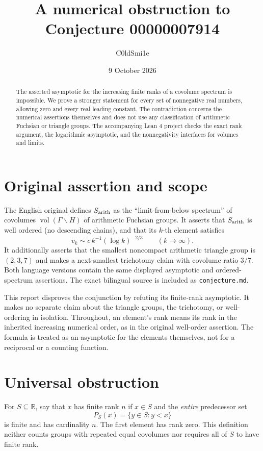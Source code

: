 \documentclass[11pt]{article}
\title{A numerical obstruction to Conjecture 00000007914}
\author{C0ldSmi1e}
\date{9 October 2026}
\newcommand{\R}{\mathbb R}
\begin{document}
\maketitle
\begin{abstract}
The asserted asymptotic for the increasing finite ranks of a covolume
spectrum is impossible. We prove a stronger statement for every set of
nonnegative real numbers, allowing zero and every real leading constant.
The contradiction concerns the numerical assertions themselves and does
not use any classification of arithmetic Fuchsian or triangle groups.
The accompanying Lean 4 project checks the exact rank argument, the
logarithmic asymptotic, and the nonnegativity interfaces for volumes and limits.
\end{abstract}

\section{Original assertion and scope}
The English original defines $S_{\rm arith}$ as the ``limit-from-below
spectrum'' of covolumes $\operatorname{vol}(\Gamma\backslash H)$ of
arithmetic Fuchsian groups. It asserts that $S_{\rm arith}$ is well ordered
(no descending chains), and that its $k$-th element satisfies
\begin{equation}\label{eq:source}
 v_k\sim c\,k^{-1}(\log k)^{-2/3}\qquad(k\longrightarrow\infty).
\end{equation}
It additionally asserts that the smallest noncompact arithmetic triangle
group is $(2,3,7)$ and makes a next-smallest trichotomy claim with covolume
ratio $3/7$. Both language versions contain the same displayed asymptotic
and ordered-spectrum assertions. The exact bilingual source is included
as \texttt{conjecture.md}.

This report disproves the conjunction by refuting its finite-rank
asymptotic. It makes no separate claim about the triangle groups,
the trichotomy, or well-ordering in isolation. Throughout, an element's
rank means its rank in the inherited increasing numerical order, as in
the original well-order assertion. The formula is treated as an
asymptotic for the elements themselves, not for a reciprocal or a
counting function.

\section{Universal obstruction}
For $S\subseteq\R$, say that $x$ has finite rank $n$ if $x\in S$ and the
\emph{entire} predecessor set
\[
 P_S(x)=\{y\in S:y<x\}
\]
is finite and has cardinality $n$. The first element has rank zero.
This definition neither counts groups with repeated equal covolumes nor
requires all of $S$ to have finite rank.
\end{document}
